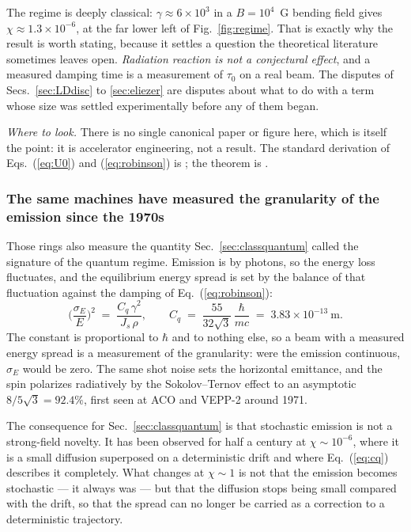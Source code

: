 \documentclass[preprint]{aastex701}
\newcommand{\taunought}{\tau_0}
\begin{document}
The regime is deeply classical: $\gamma\approx6\times10^3$ in a $B=10^4$~G
bending field gives $\chi\approx1.3\times10^{-6}$, at the far lower left of
Fig.~\ref{fig:regime}. That is exactly why the result is worth stating, because
it settles a question the theoretical literature sometimes leaves open.
\emph{Radiation reaction is not a conjectural effect}, and a measured damping
time is a measurement of $\taunought$ on a real beam. The disputes of
Secs.~\ref{sec:LDdisc} to \ref{sec:eliezer} are disputes about what to do
with a term whose size was settled experimentally before any of them began.

\emph{Where to look.} There is no single canonical paper or figure here, which
is itself the point: it is accelerator engineering, not a result. The standard
derivation of Eqs.~(\ref{eq:U0}) and (\ref{eq:robinson}) is
\citet{sands1970}; the theorem is \citet{robinson1958}.

\subsubsection{The same machines have measured the granularity of the emission
since the 1970s}
\label{sec:excitation}

Those rings also measure the quantity Sec.~\ref{sec:classquantum} called the
signature of the quantum regime. Emission is by photons, so the energy loss
fluctuates, and the equilibrium energy spread is set by the balance of that
fluctuation against the damping of Eq.~(\ref{eq:robinson}):
\begin{equation}
\Big(\frac{\sigma_E}{E}\Big)^{\!2} \;=\; \frac{C_q\,\gamma^2}{J_s\,\rho},
\qquad
C_q \;=\; \frac{55}{32\sqrt3}\,\frac{\hbar}{mc}
\;=\; 3.83\times10^{-13}~\mathrm{m}.
\label{eq:cq}
\end{equation}
The constant is proportional to $\hbar$ and to nothing else, so a beam with a
measured energy spread is a measurement of the granularity: were the emission
continuous, $\sigma_E$ would be zero. The same shot noise sets the horizontal
emittance, and the spin polarizes radiatively by the Sokolov--Ternov effect
\citep{sokolov_ternov1964} to an asymptotic $8/5\sqrt3=92.4\%$, first seen at
ACO and VEPP-2 around 1971.

The consequence for Sec.~\ref{sec:classquantum} is that stochastic emission is
not a strong-field novelty. It has been observed for half a century at
$\chi\sim10^{-6}$, where it is a small diffusion superposed on a deterministic
drift and where Eq.~(\ref{eq:cq}) describes it completely. What changes at
$\chi\sim1$ is not that the emission becomes stochastic --- it always was ---
but that the diffusion stops being small compared with the drift, so that the
spread can no longer be carried as a correction to a deterministic trajectory.
\end{document}
